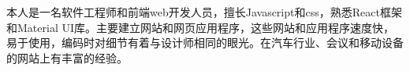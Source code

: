

\begin{cvparagraph}

本人是一名软件工程师和前端web开发人员，擅长Javascript和css，熟悉React框架和Material UI库。主要建立网站和网页应用程序，这些网站和应用程序速度快，易于使用，编码时对细节有着与设计师相同的眼光。在汽车行业、会议和移动设备的网站上有丰富的经验。
\end{cvparagraph}
